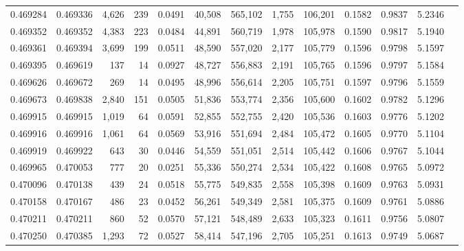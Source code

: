 \begin{tabular}{rrrrrrrrrrrrr}
0.469284 & 0.469336 & 4,626 &   239 &                                     0.0491 &  40,508 & 565,102 &   1,755 & 106,201 & 0.1582 & 0.9837 & 5.2346 \\
0.469352 & 0.469352 & 4,383 &   223 &                                     0.0484 &  44,891 & 560,719 &   1,978 & 105,978 & 0.1590 & 0.9817 & 5.1940 \\
0.469361 & 0.469394 & 3,699 &   199 &                                     0.0511 &  48,590 & 557,020 &   2,177 & 105,779 & 0.1596 & 0.9798 & 5.1597 \\
0.469395 & 0.469619 &   137 &    14 &                                     0.0927 &  48,727 & 556,883 &   2,191 & 105,765 & 0.1596 & 0.9797 & 5.1584 \\
0.469626 & 0.469672 &   269 &    14 &                                     0.0495 &  48,996 & 556,614 &   2,205 & 105,751 & 0.1597 & 0.9796 & 5.1559 \\
0.469673 & 0.469838 & 2,840 &   151 &                                     0.0505 &  51,836 & 553,774 &   2,356 & 105,600 & 0.1602 & 0.9782 & 5.1296 \\
0.469915 & 0.469915 & 1,019 &    64 &                                     0.0591 &  52,855 & 552,755 &   2,420 & 105,536 & 0.1603 & 0.9776 & 5.1202 \\
0.469916 & 0.469916 & 1,061 &    64 &                                     0.0569 &  53,916 & 551,694 &   2,484 & 105,472 & 0.1605 & 0.9770 & 5.1104 \\
0.469919 & 0.469922 &   643 &    30 &                                     0.0446 &  54,559 & 551,051 &   2,514 & 105,442 & 0.1606 & 0.9767 & 5.1044 \\
0.469965 & 0.470053 &   777 &    20 &                                     0.0251 &  55,336 & 550,274 &   2,534 & 105,422 & 0.1608 & 0.9765 & 5.0972 \\
0.470096 & 0.470138 &   439 &    24 &                                     0.0518 &  55,775 & 549,835 &   2,558 & 105,398 & 0.1609 & 0.9763 & 5.0931 \\
0.470158 & 0.470167 &   486 &    23 &                                     0.0452 &  56,261 & 549,349 &   2,581 & 105,375 & 0.1609 & 0.9761 & 5.0886 \\
0.470211 & 0.470211 &   860 &    52 &                                     0.0570 &  57,121 & 548,489 &   2,633 & 105,323 & 0.1611 & 0.9756 & 5.0807 \\
0.470250 & 0.470385 & 1,293 &    72 &                                     0.0527 &  58,414 & 547,196 &   2,705 & 105,251 & 0.1613 & 0.9749 & 5.0687 \\

\end{tabular}
